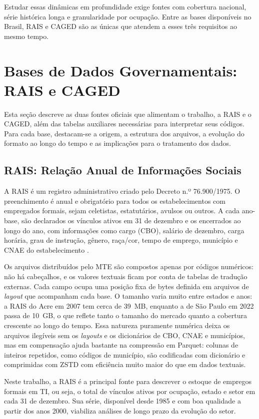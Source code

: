 Estudar essas dinâmicas em profundidade exige fontes com cobertura nacional, série histórica longa e granularidade por ocupação. Entre as bases disponíveis no Brasil, RAIS e CAGED são as únicas que atendem a esses três requisitos ao mesmo tempo.

\section{Bases de Dados Governamentais: RAIS e CAGED}

Esta seção descreve as duas fontes oficiais que alimentam o trabalho, a RAIS e o CAGED, além das tabelas auxiliares necessárias para interpretar seus códigos. Para cada base, destacam-se a origem, a estrutura dos arquivos, a evolução do formato ao longo do tempo e as implicações para o tratamento dos dados.

\subsection{RAIS: Relação Anual de Informações Sociais}

A RAIS é um registro administrativo criado pelo Decreto n.º 76.900/1975. O preenchimento é anual e obrigatório para todos os estabelecimentos com empregados formais, sejam celetistas, estatutários, avulsos ou outros. A cada ano-base, são declarados os vínculos ativos em 31 de dezembro e os encerrados ao longo do ano, com informações como cargo (CBO), salário de dezembro, carga horária, grau de instrução, gênero, raça/cor, tempo de emprego, município e CNAE do estabelecimento \cite{RAIS2024}.

Os arquivos distribuídos pelo MTE são compostos apenas por códigos numéricos: não há cabeçalhos, e os valores textuais ficam por conta de tabelas de tradução externas. Cada campo ocupa uma posição fixa de bytes definida em arquivos de \textit{layout} que acompanham cada base. O tamanho varia muito entre estados e anos: a RAIS do Acre em 2007 tem cerca de 39~MB, enquanto a de São Paulo em 2022 passa de 10~GB, o que reflete tanto o tamanho do mercado quanto a cobertura crescente ao longo do tempo. Essa natureza puramente numérica deixa os arquivos ilegíveis sem os \textit{layouts} e os dicionários de CBO, CNAE e municípios, mas em compensação ajuda bastante na compressão em Parquet: colunas de inteiros repetidos, como códigos de município, são codificadas com dicionário e comprimidas com ZSTD com eficiência muito maior do que em dados textuais.

Neste trabalho, a RAIS é a principal fonte para descrever o estoque de empregos formais em TI, ou seja, o total de vínculos ativos por ocupação, estado e setor em cada 31 de dezembro. Sua série, disponível desde 1985 e com boa qualidade a partir dos anos 2000, viabiliza análises de longo prazo da evolução do setor.

